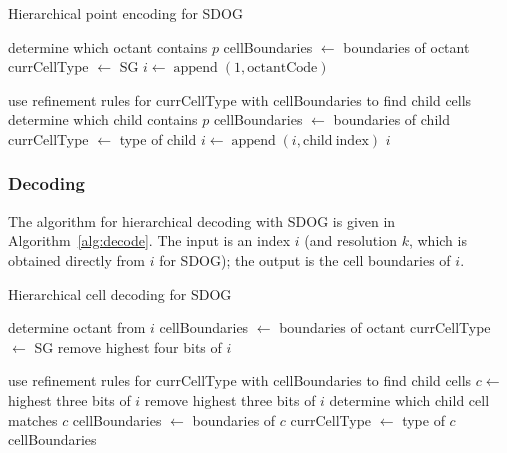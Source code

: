 \begin{algorithm}
	\caption{Hierarchical point encoding for SDOG}
	
	\begin{algorithmic}
		
		\STATE determine which octant contains $p$
		\STATE cellBoundaries $\leftarrow$ boundaries of octant
		\STATE currCellType $\leftarrow$ SG
		\STATE $i \leftarrow \operatorname{append}(1, \mathrm{octantCode})$
		
		\STATE use refinement rules for currCellType with cellBoundaries to find child cells
		\STATE determine which child contains $p$
		\STATE cellBoundaries $\leftarrow$ boundaries of child
		\STATE currCellType $\leftarrow$ type of child
		\STATE $i \leftarrow \operatorname{append}(i, \mathrm{child~index})$
		\ENDFOR
		\RETURN $i$
		
	\end{algorithmic}
	\label{alg:encode}
\end{algorithm}


\subsubsection{Decoding}
The algorithm for hierarchical decoding with SDOG is given in Algorithm~\ref{alg:decode}.
The input is an index $i$ (and resolution $k$, which is obtained directly from $i$ for SDOG); the output is the cell boundaries of $i$.


\begin{algorithm}
	\caption{Hierarchical cell decoding for SDOG}
	
	\begin{algorithmic}
		
		\STATE determine octant from $i$
		\STATE cellBoundaries $\leftarrow$ boundaries of octant
		\STATE currCellType $\leftarrow$ SG
		\STATE remove highest four bits of $i$
		
		\FOR{$k$ iterations}
		\STATE use refinement rules for currCellType with cellBoundaries to find child cells
		\STATE $c \leftarrow$ highest three bits of $i$
		\STATE remove highest three bits of $i$
		\STATE determine which child cell matches $c$
		\STATE cellBoundaries $\leftarrow$ boundaries of $c$
		\STATE currCellType $\leftarrow$ type of $c$
		\ENDFOR
		\RETURN cellBoundaries
		
	\end{algorithmic}
	\label{alg:decode}
\end{algorithm}


